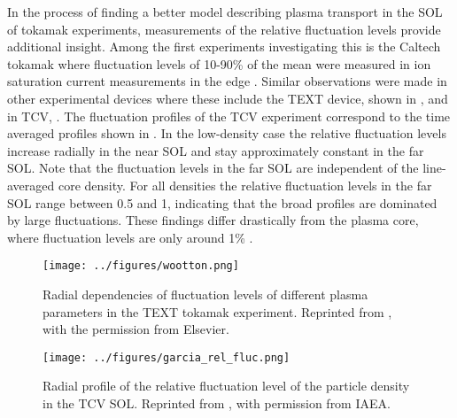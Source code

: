 In the process of finding a better model describing plasma transport in the SOL of
tokamak experiments, measurements of the relative fluctuation levels provide additional
insight. Among the first experiments investigating this is the Caltech tokamak where
fluctuation levels of 10-90\% of the mean were measured in ion saturation current
measurements in the edge \cite{zweben1982edge,zweben1983scaling}. Similar observations
were made in other experimental devices where these include the TEXT device, shown in
, and in TCV, . The fluctuation profiles
of the TCV experiment correspond to the time averaged profiles shown in
. In the low-density case the relative fluctuation levels
increase radially in the near SOL and stay approximately constant in the far SOL. Note
that the fluctuation levels in the far SOL are independent of the line-averaged core
density. For all densities the relative fluctuation levels in the far SOL range between
0.5 and 1, indicating that the broad profiles are dominated by large fluctuations. These
findings differ drastically from the plasma core, where fluctuation levels are only
around 1\% \cite{mckee2007plasma}.
\begin{figure}
  \centering
  \begin{minipage}{.48\linewidth}
    \texttt{[image: ../figures/wootton.png]}
    \caption{Radial dependencies of fluctuation levels of different plasma parameters in the TEXT tokamak experiment. Reprinted from \cite{wootton1990edge}, with the permission from Elsevier.}
    \label{Fig:wootton}
  \end{minipage}
  \hfill
  \begin{minipage}{.48\linewidth}
    \texttt{[image: ../figures/garcia\_rel\_fluc.png]}
    \caption{Radial profile of the relative fluctuation level of the particle density in the TCV SOL. Reprinted from \cite{garcia2007fluctuations}, with permission from IAEA.}
    \label{Fig:garcia_rel_fluc}
  \end{minipage}
\end{figure}

